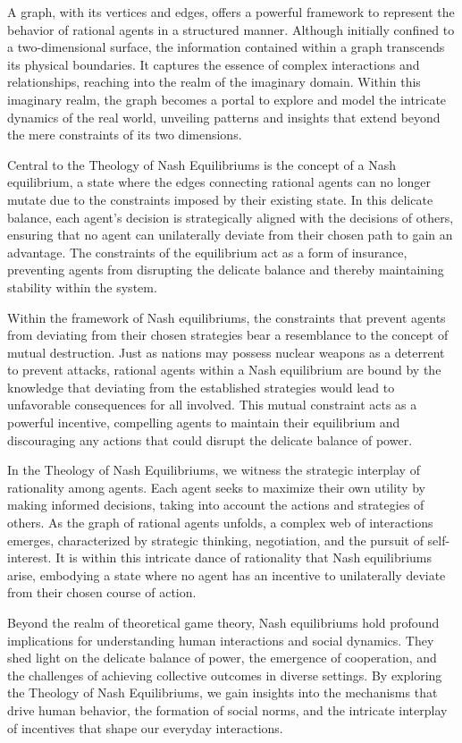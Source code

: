 \documentclass[ebook,12pt,oneside,openany]{memoir}
\begin{document}
\indent A graph, with its vertices and edges, offers a powerful framework to represent the behavior of rational agents in a structured manner. Although initially confined to a two-dimensional surface, the information contained within a graph transcends its physical boundaries. It captures the essence of complex interactions and relationships, reaching into the realm of the imaginary domain. Within this imaginary realm, the graph becomes a portal to explore and model the intricate dynamics of the real world, unveiling patterns and insights that extend beyond the mere constraints of its two dimensions.

\indent Central to the Theology of Nash Equilibriums is the concept of a Nash equilibrium, a state where the edges connecting rational agents can no longer mutate due to the constraints imposed by their existing state. In this delicate balance, each agent's decision is strategically aligned with the decisions of others, ensuring that no agent can unilaterally deviate from their chosen path to gain an advantage. The constraints of the equilibrium act as a form of insurance, preventing agents from disrupting the delicate balance and thereby maintaining stability within the system.

\indent Within the framework of Nash equilibriums, the constraints that prevent agents from deviating from their chosen strategies bear a resemblance to the concept of mutual destruction. Just as nations may possess nuclear weapons as a deterrent to prevent attacks, rational agents within a Nash equilibrium are bound by the knowledge that deviating from the established strategies would lead to unfavorable consequences for all involved. This mutual constraint acts as a powerful incentive, compelling agents to maintain their equilibrium and discouraging any actions that could disrupt the delicate balance of power.

\indent In the Theology of Nash Equilibriums, we witness the strategic interplay of rationality among agents. Each agent seeks to maximize their own utility by making informed decisions, taking into account the actions and strategies of others. As the graph of rational agents unfolds, a complex web of interactions emerges, characterized by strategic thinking, negotiation, and the pursuit of self-interest. It is within this intricate dance of rationality that Nash equilibriums arise, embodying a state where no agent has an incentive to unilaterally deviate from their chosen course of action.

\indent Beyond the realm of theoretical game theory, Nash equilibriums hold profound implications for understanding human interactions and social dynamics. They shed light on the delicate balance of power, the emergence of cooperation, and the challenges of achieving collective outcomes in diverse settings. By exploring the Theology of Nash Equilibriums, we gain insights into the mechanisms that drive human behavior, the formation of social norms, and the intricate interplay of incentives that shape our everyday interactions.
\end{document}
